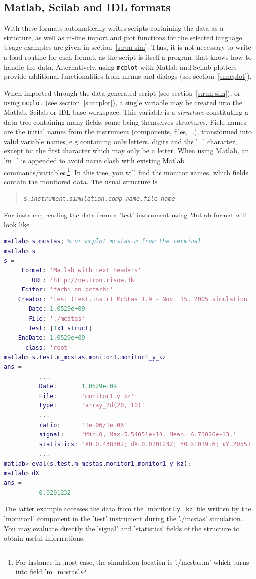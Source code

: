 \subsection{Matlab, Scilab and IDL formats}
   

With these formats \MCS automatically writes scripts containing the data as a structure, as well as in-line import and plot functions for the selected language. Usage examples are given in section~\ref{s:run-sim}.
Thus, it is not necessary to write a load routine for each format, as the script is itself a program that knows how to handle the data. Alternatively, using \verb+mcplot+ with Matlab and Scilab plotters provide additional functionalities from menus and dialogs (see section~\ref{s:mcplot}).

When imported through the data generated script (see section~\ref{s:run-sim}), or using \verb+mcplot+ (see section~\ref{s:mcplot}), a single variable may be created into the Matlab, Scilab or IDL base workspace. This variable is a \emph{structure} constituting a data tree containing many fields, some being themselves structures. Field names are the initial names from the instrument (components, files, \ldots), transformed into valid variable names, e.g containing only letters, digits and the '\_' character, except for the first character which may only be a letter. When using Matlab, an 'm\_' is appended to avoid name clash with existing Matlab commands/variables.\footnote{For instance in most case, the simulation location is './mcstas.m' which turns into field 'm\_mcstas'.}.
In this tree, you will find the monitor names, which fields contain the monitored data. The usual structure is
\begin{quote}
  \texttt{s.{\it instrument}.{\it simulation}.{\it comp\_name}.{\it file\_name}}
\end{quote}

For instance, reading the data from a 'test' instrument using Matlab format will look like
\begin{lstlisting}[language=Matlab]
matlab> s=mcstas; % or mcplot mcstas.m from the terminal
matlab> s
s =
     Format: 'Matlab with text headers'
        URL: 'http://neutron.risoe.dk'
     Editor: 'farhi on pcfarhi'
    Creator: 'test (test.instr) McStas 1.9 - Nov. 15, 2005 simulation'
       Date: 1.0529e+09
       File: './mcstas'
       test: [1x1 struct]
    EndDate: 1.0529e+09
      class: 'root'
matlab> s.test.m_mcstas.monitor1.monitor1_y_kz
ans =
          ...
          Date:       1.0529e+09
          File:       'monitor1.y_kz'
          type:       'array_2d(20, 10)'
          ...
          ratio:      '1e+06/1e+06'
          signal:     'Min=0; Max=5.54051e-10; Mean= 6.73026e-13;'
          statistics: 'X0=0.438302; dX=0.0201232; Y0=51019.6; dY=20557.1;'
          ...
matlab> eval(s.test.m_mcstas.monitor1.monitor1_y_kz);
matlab> dX
ans =
          0.0201232
\end{lstlisting}
The latter example accesses the data from the 'monitor1.y\_kz' file written by the 'monitor1' component in the 'test' instrument during the './mcstas' simulation. You may evaluate directly the 'signal' and 'statistics' fields of the structure to obtain useful informations.

